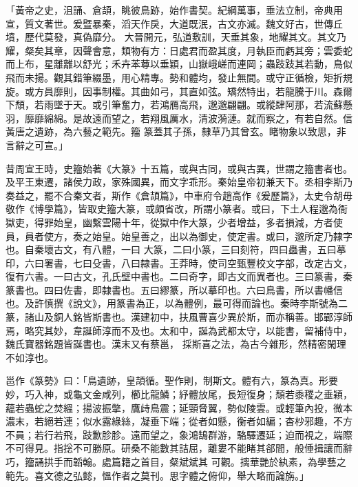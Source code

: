 \begin{pinyinscope}
 「黃帝之史，沮誦、倉頡，眺彼鳥跡，始作書契。紀綱萬事，垂法立制，帝典用宣，質文著世。爰暨暴秦，滔天作戾，大道既泯，古文亦滅。魏文好古，世傳丘墳，歷代莫發，真偽靡分。
 大晉開元，弘道敷訓，天垂其象，地耀其文。其文乃耀，粲矣其章，因聲會意，類物有方：日處君而盈其度，月執臣而虧其旁；雲委蛇而上布，星離離以舒光；禾卉苯䔿以垂穎，山嶽峨嵯而連岡；蟲跂跂其若動，鳥似飛而未揚。觀其錯筆綴墨，用心精專。勢和體均，發止無間。或守正循檢，矩折規旋。或方員靡則，因事制權。其曲如弓，其直如弦。矯然特出，若龍騰于川。森爾下頹，若雨墜于天。或引筆奮力，若鴻鴈高飛，邈邈翩翩。或縱肆阿那，若流蘇懸羽，靡靡綿綿。是故遠而望之，若翔風厲水，清波漪漣。就而察之，有若自然。信黃唐之遺跡，為六藝之範先。籀
 篆蓋其子孫，隸草乃其曾玄。睹物象以致思，非言辭之可宣。」



 昔周宣王時，史籀始著《大篆》十五篇，或與古同，或與古異，世謂之籀書者也。及平王東遷，諸侯力政，家殊國異，而文字乖形。秦始皇帝初兼天下。丞相李斯乃奏益之，罷不合秦文者，斯作《倉頡篇》，中車府令趙高作《爰歷篇》，太史令胡毋敬作《博學篇》，皆取史籀大篆，或頗省改，所謂小篆者。或曰，下土人程邈為衙獄吏，得罪始皇，幽繫雲陽十年，從獄中作大篆，少者增益，多者損減，方者使員，員者使方，奏之始皇。始皇善之，出以為御史，使定書。或曰，邈所定乃隸字也。自秦壞古文，有八體，一曰
 大篆，二曰小篆，三曰刻符，四曰蟲書，五曰摹印，六曰署書，七曰殳書，八曰隸書。王莽時，使司空甄豐校文字部，改定古文，復有六書。一曰古文，孔氏壁中書也。二曰奇字，即古文而異者也。三曰篆書，秦篆書也。四曰佐書，即隸書也。五曰繆篆，所以摹印也。六曰鳥書，所以書幡信也。及許慎撰《說文》，用篆書為正，以為體例，最可得而論也。秦時李斯號為二篆，諸山及銅人銘皆斯書也。漢建初中，扶風曹喜少異於斯，而亦稱善。邯鄲淳師焉，略究其妙，韋誕師淳而不及也。太和中，誕為武都太守，以能書，留補侍中，魏氏寶器銘題皆誕書也。漢末又有蔡邕，
 採斯喜之法，為古今雜形，然精密閑理不如淳也。



 邕作《篆勢》曰：「鳥遺跡，皇頡循。聖作則，制斯文。體有六，篆為真。形要妙，巧入神，或龜文金咸列，櫛比龍鱗；紓體放尾，長短復身；頹若黍稷之垂穎，蘊若蟲蛇之焚縕；揚波振撆，鷹歭鳥震；延頸脅翼，勢似陵雲。或輕筆內投，微本濃末，若絕若連；似水露綠絲，凝垂下端；從者如懸，衡者如編；杳杪邪趣，不方不員；若行若飛，跂歉胗胗。遠而望之，象鴻鵠群游，駱驛遷延；迫而視之，端際不可得見。指捴不可勝原。研桑不能數其詰屈，離婁不能睹其郤間，般倕揖讓而辭巧，籀誦拱手而韜翰。處篇籍之首目，粲斌斌其
 可觀。摛華艷於紈素，為學藝之範先。喜文德之弘懿，慍作者之莫刊。思字體之俯仰，舉大略而論旃。」




\end{pinyinscope}
